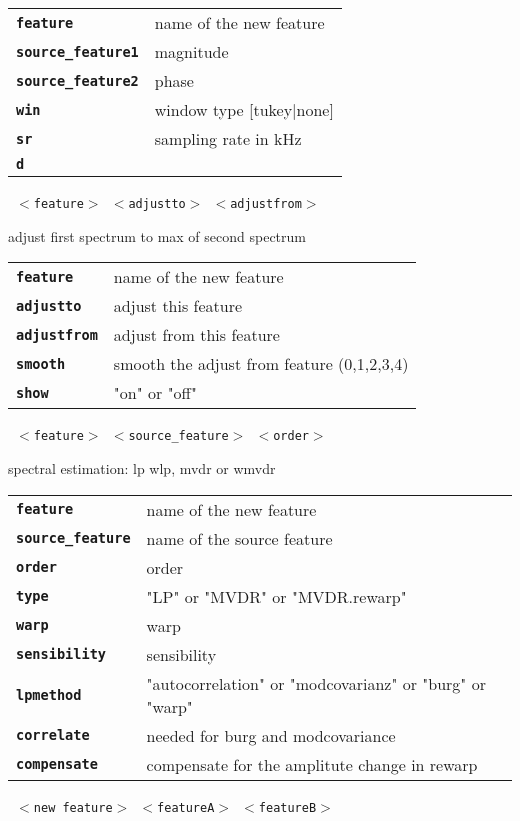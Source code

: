 \begin{description}
\begin{description}
      \begin{tabular}{ll}
 \texttt{\textbf{feature}} &          name of the new feature \\
 \texttt{\textbf{source\_feature1}} &  magnitude \\
 \texttt{\textbf{source\_feature2}} &  phase \\
 \texttt{\textbf{win}} &               window type [tukey|none]  \\
 \texttt{\textbf{sr}} &                sampling rate in kHz  \\
 \texttt{\textbf{d}} &                   \\
      \end{tabular}
       \texttt{ $<$feature$>$ $<$adjustto$>$ $<$adjustfrom$>$  } \

        adjust first spectrum to max of second spectrum

      \begin{tabular}{ll}
 \texttt{\textbf{feature}} &     name of the new feature \\
 \texttt{\textbf{adjustto}} &    adjust this feature \\
 \texttt{\textbf{adjustfrom}} &  adjust from this feature \\
 \texttt{\textbf{smooth}} &       smooth the adjust from feature (0,1,2,3,4)  \\
 \texttt{\textbf{show}} &         "on" or "off"   \\
      \end{tabular}
       \texttt{ $<$feature$>$ $<$source\_feature$>$ $<$order$>$      } \

        spectral estimation: lp wlp, mvdr or wmvdr

      \begin{tabular}{ll}
 \texttt{\textbf{feature}} &         name of the new feature \\
 \texttt{\textbf{source\_feature}} &  name of the source feature \\
 \texttt{\textbf{order}} &           order  \\
 \texttt{\textbf{type}} &             "LP" or "MVDR" or "MVDR.rewarp"   \\
 \texttt{\textbf{warp}} &             warp  \\
 \texttt{\textbf{sensibility}} &      sensibility  \\
 \texttt{\textbf{lpmethod}} &         "autocorrelation" or "modcovarianz" or "burg" or "warp"   \\
 \texttt{\textbf{correlate}} &        needed for burg and modcovariance  \\
 \texttt{\textbf{compensate}} &       compensate for the amplitute change in rewarp  \\
      \end{tabular}
       \texttt{ $<$new feature$>$ $<$featureA$>$ $<$featureB$>$  } \


\end{description}
\end{description}
